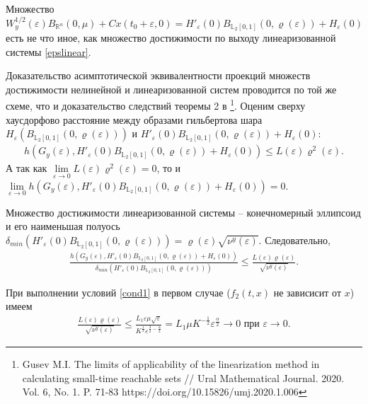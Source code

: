 \documentclass[../main.tex]{subfiles}
\begin{document}
	Множество $ W_y^{1/2}(\varepsilon)B_{\mathbb{R}^n}(0,\mu) + Cx(t_0+\varepsilon,0)  = H'_{\varepsilon}(0)B_{\mathbb{L}_2[0,1]}(0,\varrho(\varepsilon))+ H_{\varepsilon}(0)$ есть не что иное, как множество достижимости по выходу линеаризованной системы \eqref{epslinear}.
	
	Доказательство асимптотической эквивалентности проекций множеств достижимости нелинейной и линеаризованной систем проводится по той же схеме, что и доказательство следствий теоремы 2 в \footnote{Gusev M.I. The limits of applicability of the linearization method in calculating small-time reachable sets // Ural Mathematical Journal. 2020. Vol. 6, No. 1. P. 71-83 https://doi.org/10.15826/umj.2020.1.006}. Оценим сверху хаусдорфово расстояние между образами гильбертова шара $ H_{\varepsilon}\left( B_{\mathbb{L}_2[0,1]}(0,\varrho(\varepsilon))\right)  $ и $ H'_{\varepsilon}(0)B_{\mathbb{L}_2[0,1]}(0,\varrho(\varepsilon))+ H_{\varepsilon}(0) $:
	\begin{gather*}
		h\left( G_y(\varepsilon), H'_{\varepsilon}(0)B_{\mathbb{L}_2[0,1]}(0,\varrho(\varepsilon))+ H_{\varepsilon}(0)\right)  \leqslant L(\varepsilon) \varrho^2(\varepsilon).
	\end{gather*}
	А так как $ \lim\limits_{\varepsilon \rightarrow 0}  L(\varepsilon) \varrho^2(\varepsilon) = 0 $, то и $ \lim\limits_{\varepsilon \rightarrow 0} h\left( G_y(\varepsilon), H'_{\varepsilon}(0)B_{\mathbb{L}_2[0,1]}(0,\varrho(\varepsilon))+ H_{\varepsilon}(0)\right)  = 0 $.
	
	
	Множество достижимости линеаризованной системы -- конечномерный эллипсоид и его наименьшая полуось $ \delta_{min}\left(H'_{\varepsilon}(0)B_{\mathbb{L}_2[0,1]}(0,\varrho(\varepsilon)) \right)=\varrho(\varepsilon)\sqrt{\nu^y(\varepsilon)} $. 
	Следовательно,
	\begin{gather*}
		\frac{h\left(G_y(\varepsilon), H'_{\varepsilon}(0)B_{\mathbb{L}_2[0,1]}(0,\varrho(\varepsilon))+ H_{\varepsilon}(0)\right) }{\delta_{min}\left( H'_{\varepsilon}(0)B_{\mathbb{L}_2[0,1]}(0,\varrho(\varepsilon))\right) } \leqslant \frac{L(\varepsilon) \varrho(\varepsilon)}{\sqrt{\nu^y(\varepsilon)}}.
	\end{gather*}
	
	При выполнении условий \eqref{cond1} в первом случае ($ f_2(t,x) $ не зависисит от $ x $) имеем
	\begin{gather*}
		\frac{L(\varepsilon) \varrho(\varepsilon)}{\sqrt{\nu^y(\varepsilon)}} 
		\leqslant
		\frac{L_1\varepsilon\mu\sqrt{\varepsilon}}{K^{\frac{1}{2}}\varepsilon^{\frac{3}{2}-\frac{\alpha}{2}}} 
		=
		L_1\mu K^{-\frac{1}{2}}\varepsilon^{\frac{\alpha}{2}} \rightarrow 0 \mbox{\ при\ } \varepsilon \rightarrow 0.
	\end{gather*}
	
\end{document}
